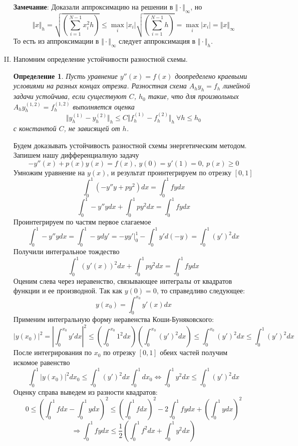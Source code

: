 \documentclass[12pt]{article}
\newtheorem*{definition}{Определение}
\begin{document}
\begin{enumerate}[I.]
	      \textbf{Замечание}: Доказали аппроксимацию на решении в $\Vert\cdot\Vert_{\infty}$, но
	      \[\Vert x\Vert_h=\sqrt{\left(\sum_{i=1}^{N-1}x_i^2h\right)}\leq\max_i|x_i|\sqrt{\left(\sum_{i=1}^{N-1}h\right)}=\max_i|x_i|=\Vert x\Vert_{\infty}\]
	      То есть из аппроксимации в $\Vert\cdot\Vert_{\infty}$ следует аппроксимация в $\Vert\cdot\Vert_h$.

	      \newpage

	\item Напомним определение устойчивости разностной схемы.
	      \begin{definition}
		      Пусть уравнение $y''(x)=f(x)$ доопределено краевыми
		      условиями на разных концах отрезка. Разностная схема
		      $A_hy_h = f_h$ линейной задачи устойчива, если существуют $C$, $h_0$ такие, что для
		      произвольных $A_hy^{(1,2)}_h = f^{(1,2)}_h$ выполняется оценка
		      \[\Vert y^{(1)}_h-y^{(2)}_h\Vert_h\leq C\Vert f^{(1)}_h -f^{(2)}_h\Vert_h\ \forall h\leq h_0\]
		      с константой $C$, не зависящей от $h$.
	      \end{definition}

	      Будем доказывать устойчивость разностной схемы энергетическим методом.
	      Запишем нашу дифференциалную задачу
	      \[-y''(x)+p(x)y(x)=f(x),\ y(0) = y'(1) = 0,\ p(x)\geq 0\]
	      Умножим уравнение на $y(x)$, и результат проинтегрируем по отрезку $[0, 1]$
	      \[\int_0^1 (-y''y+py^2)dx = \int_0^1fydx \]
	      \[\int_0^1 -y''ydx+ \int_0^1py^2 dx = \int_0^1fydx \]
	      Проинтегрируем по частям первое слагаемое
	      \[\int_0^1 -y''ydx = \int_0^1-ydy' = -yy'\vert^1_0 - \int_0^1y'd(-y) = \int_0^1(y')^2dx\]
	      Получили интегральное тождество
	      \[\int_0^1 (y'(x))^2dx+ \int_0^1py^2 dx = \int_0^1fydx \]
	      Оценим слева через неравенство, связывающее интегралы от квадратов
	      функции и ее производной. Так как $y(0) = 0$, то справедливо следующее:
	      \[y(x_0) = \int_0^{x_0}y'(x)dx\]
	      Применим интегральную форму неравенства Коши-Буняковского:
	      \[|y(x_0)|^2 = \left|\int_0^{x_0}y'dx\right|^2\leq\left(\int_0^{x_0}1^2dx\right)\left(\int_0^{x_0}(y')^2dx\right)\leq\int_0^{x_0}(y')^2dx\leq\int_0^{1}(y')^2dx\]
	      После интегрирования по $x_0$ по отрезку $[0,1]$ обеих частей получим искомое равенство
	      \[\int_0^1|y(x_0)|^2dx_0 \leq \int_0^{1}(y')^2dx\int_0^1dx_0 \Leftrightarrow \int_0^1y^2dx\leq\int_0^1(y')^2dx\]
	      Оценку справа выведем из разности квадратов:
	      \[0\leq\left(\int_0^1fdx-\int_0^1ydx\right)^2\leq\left(\int_0^1fdx\right)^2-2\int_0^1fydx+\left(\int_0^1ydx\right)^2\]
	      \[\Rightarrow\int_0^1fydx\leq\frac{1}{2}\left(\int_0^1f^2dx + \int_0^1y^2dx\right)\]


\end{enumerate}
\end{document}
